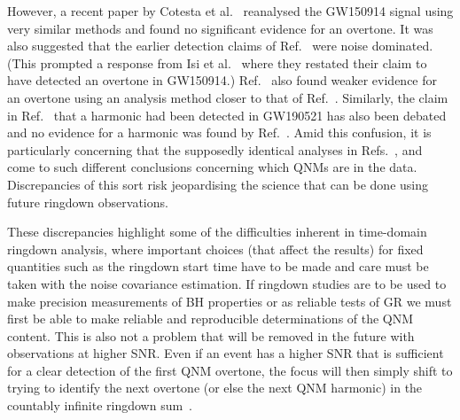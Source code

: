 However, a recent paper by Cotesta et al.~\cite{Cotesta:2022pci} reanalysed the GW150914 signal using very similar methods and found no significant evidence for an overtone.
It was also suggested that the earlier detection claims of Ref.~\cite{Isi:2019aib} were noise dominated.
(This prompted a response from Isi et al.~\cite{Isi:2022mhy} where they restated their claim to have detected an overtone in GW150914.) 
Ref.~\cite{Bustillo:2020buq} also found weaker evidence for an overtone using an analysis method closer to that of Ref.~\cite{LIGOScientific:2016lio}.
Similarly, the claim in Ref.~\cite{Capano:2021etf} that a harmonic had been detected in GW190521 has also been debated and no evidence for a harmonic was found by Ref.~\cite{LIGOScientific:2021sio}.
Amid this confusion, it is particularly concerning that the supposedly identical analyses in Refs.~\cite{Isi:2019aib, Isi:2022mhy}, and~\cite{Cotesta:2022pci} come to such different conclusions concerning which QNMs are in the data. 
Discrepancies of this sort risk jeopardising the science that can be done using future ringdown observations.

These discrepancies highlight some of the difficulties inherent in time-domain ringdown analysis, where important choices (that affect the results) for fixed quantities such as the ringdown start time have to be made and care must be taken with the noise covariance estimation.
If ringdown studies are to be used to make precision measurements of BH properties or as reliable tests of GR we must first be able to make reliable and reproducible determinations of the QNM content.
This is also not a problem that will be removed in the future with observations at higher SNR. Even if an event has a higher SNR that is sufficient for a clear detection of the first QNM overtone, the focus will then simply shift to trying to identify the next overtone (or else the next QNM harmonic) in the countably infinite ringdown sum~\cite{Bustillo:2020buq}.

